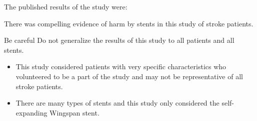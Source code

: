 \documentclass{beamer}
\begin{document}
\begin{frame}
\begin{note}
The published results of the study were:
\vspace{-1.5mm}\begin{center}There was compelling evidence of harm by stents in this study of stroke patients.\end{center}\vspace{-4mm}
\end{note}\pause

\begin{block}{Be careful}
Do not generalize the results of this study to all patients and all stents.\pause

\begin{itemize}
\item This study considered patients with very specific characteristics who volunteered to be a part of the study and may not be representative of all stroke patients.\pause
\item There are many types of stents and this study only considered the self-expanding Wingspan stent.
\end{itemize}
\end{block}
\end{frame}
\end{document}
